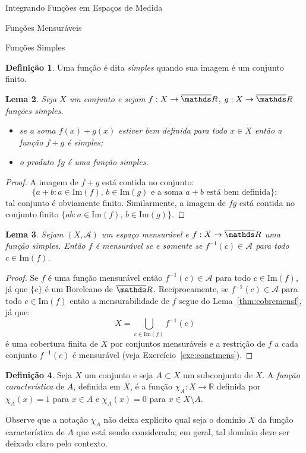 \documentclass[oneside,final,11pt]{amsbook}
\newcommand{\R}{\mathds R}
\newcommand{\Img}{\mathrm{Im}}
\theoremstyle{remark}\newtheorem{exercise}{Exercício}[chapter]
\theoremstyle{remark}\newtheorem{*exercise}[exercise]{\hbox to 0pt{\hskip 0pt minus 1fil*}Exercício}
\theoremstyle{definition}\newtheorem{exdefin}{Definição}[chapter]
\theoremstyle{plain}\newtheorem{teo}{Teorema}[section]
\theoremstyle{plain}\newtheorem{lem}[teo]{Lema}
\theoremstyle{plain}\newtheorem{prop}[teo]{Proposição}
\theoremstyle{plain}\newtheorem{cor}[teo]{Corolário}
\theoremstyle{definition}\newtheorem{defin}[teo]{Definição}
\theoremstyle{remark}\newtheorem{rem}[teo]{Observação}
\theoremstyle{definition}\newtheorem{notation}[teo]{Notação}
\theoremstyle{definition}\newtheorem{convention}[teo]{Convenção}
\theoremstyle{definition}\newtheorem{example}[teo]{Exemplo}
\numberwithin{section}{chapter}
\numberwithin{equation}{section}
\begin{document}
\begin{chapter}{Integrando Funções em Espaços de Medida}
\begin{section}{Funções Mensuráveis}
\begin{subsection}{Funções Simples}

\begin{defin}\label{thm:deffuncsimples}
Uma função é dita {\em simples\/} quando sua imagem é um conjunto finito.
\end{defin}

\begin{lem}\label{thm:somaprodsimples}
Seja $X$ um conjunto e sejam $f:X\to\overline\R$, $g:X\to\overline\R$ funções simples.
\begin{itemize}
\item se a soma $f(x)+g(x)$ estiver bem definida para todo $x\in X$ então a função $f+g$ é simples;
\item o produto $fg$ é uma função simples.
\end{itemize}
\end{lem}
\begin{proof}
A imagem de $f+g$ está contida no conjunto:
\[\big\{a+b:\text{$a\in\Img(f)$, $b\in\Img(g)$ e a soma $a+b$ está bem definida}\big\};\]
tal conjunto é obviamente finito. Similarmente, a imagem de $fg$ está contida no conjunto finito
$\{ab:\text{$a\in\Img(f)$, $b\in\Img(g)$}\big\}$.
\end{proof}

\begin{lem}\label{thm:condsimplesmens}
Sejam $(X,\mathcal A)$ um espaço mensurável e $f:X\to\overline\R$ uma função simples.
Então $f$ é mensurável se e somente se $f^{-1}(c)\in\mathcal A$ para todo $c\in\Img(f)$.
\end{lem}
\begin{proof}
Se $f$ é uma função mensurável então $f^{-1}(c)\in\mathcal A$ para todo $c\in\Img(f)$, já que
$\{c\}$ é um Boreleano de $\overline\R$. Reciprocamente, se $f^{-1}(c)\in\mathcal A$ para todo
$c\in\Img(f)$ então a mensurabilidade de $f$ segue do Lema~\ref{thm:cobremensf}, já que:
\[X=\!\!\bigcup_{c\in\Img(f)}\!\!f^{-1}(c)\]
é uma cobertura finita de $X$ por conjuntos mensuráveis e a restrição de $f$ a cada conjunto
$f^{-1}(c)$ é mensurável (veja Exercício~\ref{exe:constmens}).
\end{proof}

\begin{defin}
Seja $X$ um conjunto e seja $A\subset X$ um subconjunto de $X$. A {\em função característica\/} de $A$,
definida em $X$, é a função $\chi_A:X\to\R$ definida por $\chi_A(x)=1$ para $x\in A$ e $\chi_A(x)=0$ para $x\in X\setminus A$.
\end{defin}
Observe que a notação $\chi_A$ não deixa explícito qual seja o domínio $X$ da função característica de $A$ que está sendo considerada;
em geral, tal domínio deve ser deixado claro pelo contexto.


\end{subsection}
\end{section}
\end{chapter}
\end{document}
